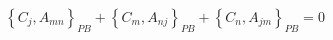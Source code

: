 \begin{equation}
\left\{  C_{j},A_{mn}\right\}  _{PB}+\left\{  C_{m},A_{nj}\right\}
_{PB}+\left\{  C_{n},A_{jm}\right\}  _{PB}=0
\end{equation}

